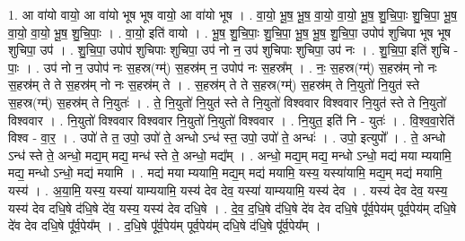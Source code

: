 \documentclass[17pt]{extarticle}
\begin{document}
1. आ वा॑यो वायो॒ आ वा॑यो भूष भूष वायो॒ आ वा॑यो भूष । . वा॒यो॒ भू॒ष॒ भू॒ष॒ वा॒यो॒ वा॒यो॒ भू॒ष॒ शु॒चि॒पाः॒ शु॒चि॒पा॒ भू॒ष॒ वा॒यो॒ वा॒यो॒ भू॒ष॒ शु॒चि॒पाः॒ । . वा॒यो॒ इति॑ वायो । . भू॒ष॒ शु॒चि॒पाः॒ शु॒चि॒पा॒ भू॒ष॒ भू॒ष॒ शु॒चि॒पा॒ उपोप॑ शुचिपा भूष भूष शुचिपा॒ उप॑ । . शु॒चि॒पा॒ उपोप॑ शुचिपाः शुचिपा॒ उप॑ नो न॒ उप॑ शुचिपाः शुचिपा॒ उप॑ नः । . शु॒चि॒पा॒ इति॑ शुचि - पाः॒ । . उप॑ नो न॒ उपोप॑ नः स॒हस्र(ग्म्॑) स॒हस्र॑म् न॒ उपोप॑ नः स॒हस्र᳚म् । . नः॒ स॒हस्र(ग्म्॑) स॒हस्र॑म् नो नः स॒हस्र॑म् ते ते स॒हस्र॑म् नो नः स॒हस्र॑म् ते । . स॒हस्र॑म् ते ते स॒हस्र(ग्म्॑) स॒हस्र॑म् ते नि॒युतो॑ नि॒युत॑ स्ते स॒हस्र(ग्म्॑) स॒हस्र॑म् ते नि॒युतः॑ । . ते॒ नि॒युतो॑ नि॒युत॑ स्ते ते नि॒युतो॑ विश्ववार विश्ववार नि॒युत॑ स्ते ते नि॒युतो॑ विश्ववार । . नि॒युतो॑ विश्ववार विश्ववार नि॒युतो॑ नि॒युतो॑ विश्ववार । . नि॒युत॒ इति॑ नि - युतः॑ । . वि॒श्व॒वा॒रेति॑ विश्व - वा॒र॒ । . उपो॑ ते त॒ उपो॒ उपो॑ ते॒ अन्धो ऽन्ध॑ स्त॒ उपो॒ उपो॑ ते॒ अन्धः॑ । . उपो॒ इत्युपो᳚ । . ते॒ अन्धो ऽन्ध॑ स्ते ते॒ अन्धो॒ मद्य॒म् मद्य॒ मन्ध॑ स्ते ते॒ अन्धो॒ मद्य᳚म् । . अन्धो॒ मद्य॒म् मद्य॒ मन्धो ऽन्धो॒ मद्य॑ मया म्ययामि॒ मद्य॒ मन्धो ऽन्धो॒ मद्य॑ मयामि । . मद्य॑ मया म्ययामि॒ मद्य॒म् मद्य॑ मयामि॒ यस्य॒ यस्या॑यामि॒ मद्य॒म् मद्य॑ मयामि॒ यस्य॑ । . अ॒या॒मि॒ यस्य॒ यस्या॑ याम्ययामि॒ यस्य॑ देव देव॒ यस्या॑ याम्ययामि॒ यस्य॑ देव । . यस्य॑ देव देव॒ यस्य॒ यस्य॑ देव दधि॒षे द॑धि॒षे दे॑व॒ यस्य॒ यस्य॑ देव दधि॒षे । . दे॒व॒ द॒धि॒षे द॑धि॒षे दे॑व देव दधि॒षे पू᳚र्व॒पेय॑म् पूर्व॒पेय॑म् दधि॒षे दे॑व देव दधि॒षे पू᳚र्व॒पेय᳚म् । . द॒धि॒षे पू᳚र्व॒पेय॑म् पूर्व॒पेय॑म् दधि॒षे द॑धि॒षे पू᳚र्व॒पेय᳚म् । \newline
\end{document}

